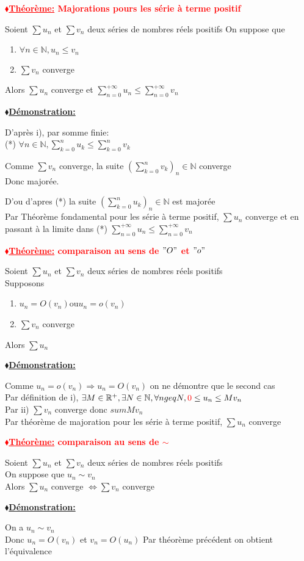 \documentclass[12pt]{report}
\newcommand{\rd}[1]{\textcolor{red}{#1}}
\newcommand{\blz}{$\blacklozenge$}
\newcommand{\ns}{\\\indent\indent\vspace{0.25cm}}
\newcommand{\props}[1]
{
\begin{mybox}
\textbf{\rd{\underline{\blz Théorème:} #1}}
\vspace{0.5cm}
\newline
}
\newcommand{\prope}
{
\end{mybox}
}
\newcommand{\demos}[1]
{
\begin{demo}
\textbf{\underline{\blz Démonstration:} #1}
\newline
}
\newcommand{\demoe}
{
\end{demo}
}
\newcommand{\R}{\mathbb{R}}
\newcommand{\N}{\mathbb{N}}
\newcommand{\nint}[1]{#1 \in \N}
\newcommand{\un}[1]{u_{#1}}
\newcommand{\seriegu}{\sum u_n}
\newcommand{\seriegv}{\sum v_n}
\newcommand{\serie}[3]{\sum_{#1}^{#2}{#3}}
\newcommand{\satps}{série à terme positif}
\begin{document}
\props{Majorations pours les \satps}
Soient $\seriegu$ et $\seriegv$ deux séries de nombres réels positifs
On suppose que
\begin{enumerate}[label=\roman*)]
  \item $\forall \nint{n} , u_n \leq v_n$
  \item $ \seriegv$ converge
\end{enumerate}
Alors $\seriegu$ converge et $\serie{n=0}{+\infty}{u_n} \leq \serie{n=0}{+\infty}{v_n}$
\prope

\demos{}
D'après i), par somme finie: \\
(*) $\forall \nint{n}, \serie{k=0}{n}{u_k} \leq \serie{k=0}{n}{v_k}$ \ns

Comme $\seriegv$ converge, la suite $(\serie{k=0}{n}{v_k})_\nint{n}$ converge \\
Donc majorée.

D'ou d'apres (*) la suite $(\serie{k=0}{n}{u_k})_\nint{n}$ est majorée\\
Par Théorème fondamental pour les \satps, $\seriegu$ converge et en passant à la limite dans (*) $\serie{n=0}{+\infty}{u_n} \leq \serie{n=0}{+\infty}{v_n}$
\demoe

\props{comparaison au sens de $"O"$ et $"o"$}
Soient $\seriegu$ et $\seriegv$  deux séries de nombres réels positifs\\
Supposons
\begin{enumerate}[label=\roman*)]
  \item $u_n = O(v_n) $ou$ u_n = o(v_n)$
  \item $\seriegv$ converge
\end{enumerate}
Alors $\seriegu$
\prope

\demos{}
Comme $ u_n = o(v_n) \Rightarrow u_n = O(v_n)$ on ne démontre que le second cas\\

Par définition de i), $\exists M \in \R^+,\exists N \in \N,\forall n geq N , \rd{0} \leq \un{n} \leq M v_n$ \\
Par ii) $\seriegv$ converge donc $sum M v_n$ \\
Par théorème de majoration pour les \satps, $\seriegu$ converge
\demoe

\props{comparaison au sens de $\sim$}
Soient $\seriegu$ et $\seriegv$  deux séries de nombres réels positifs\\
On suppose que $u_n \sim v_n$\\
Alors $\seriegu$ converge $\Leftrightarrow \seriegv$ converge
\prope

\demos{}
On a $u_n \sim v_n$\\
Donc  $u_n = O(v_n)$ et  $v_n = O(u_n)$
Par théorème précédent on obtient l'équivalence
\demoe
\end{document}
